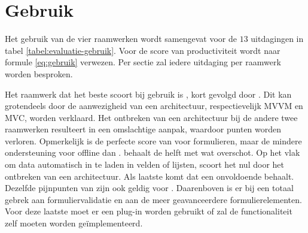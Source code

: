 \section{Gebruik}
\label{sec:evaluatie-gebruik}
Het gebruik van de vier raamwerken wordt samengevat voor de $13$ uitdagingen in tabel \ref{tabel:evaluatie-gebruik}.
Voor de score van productiviteit wordt naar formule \ref{eq:gebruik} verwezen.
Per sectie zal iedere uitdaging per raamwerk worden besproken.



\begin{table}[H]
\centering
{}
\caption{Overzicht van gebruik voor \st{}~(\sta), \kendo{}~(\kendoa), \jqm{}~(\jqma) en \lungo{}~(\lungoa).}
\label{tabel:evaluatie-gebruik}
\end{table}

Het raamwerk dat het beste scoort bij gebruik is \kendo{}, kort gevolgd door \st{}.
Dit kan grotendeels door de aanwezigheid van een architectuur, respectievelijk MVVM en MVC, worden verklaard.
Het ontbreken van een architectuur bij de andere twee raamwerken resulteert in een omslachtige aanpak, waardoor punten worden verloren.
Opmerkelijk is de perfecte score van \kendo{} voor formulieren, maar de mindere ondersteuning voor offline dan \st{}.
\jqm{} behaalt de helft met wat overschot.
Op het vlak om data automatisch in te laden in velden of lijsten, scoort het nul door het ontbreken van een architectuur. 
Als laatste komt \lungo{} dat een onvoldoende behaalt.
Dezelfde pijnpunten van \jqm{} zijn ook geldig voor \lungo{}.
Daarenboven is er bij \lungo{} een totaal gebrek aan formuliervalidatie en aan de meer geavanceerdere formulierelementen.
Voor deze laatste moet er een plug-in worden gebruikt of zal de functionaliteit zelf moeten worden geïmplementeerd. 

